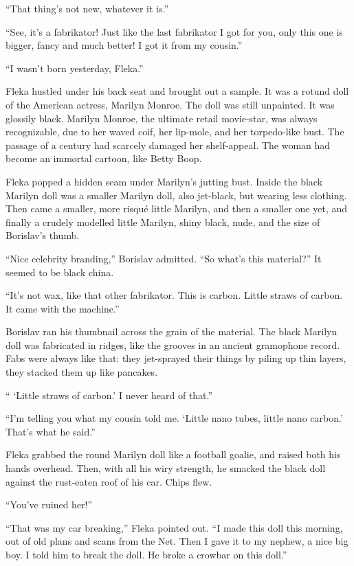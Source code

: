 \documentclass[20 pt,twoside,extrafontsizes,final]{memoir}
\begin{document}
``That thing's not new, whatever it is.''

``See, it's a fabrikator! Just like the last fabrikator I got for you, only this one is bigger, fancy and much better! I got it from my cousin.''

``I wasn't born yesterday, Fleka.''

Fleka hustled under his back seat and brought out a sample. It was a rotund doll of the American actress, Marilyn Monroe. The doll was still unpainted. It was glossily black.
Marilyn Monroe, the ultimate retail movie-star, was always recognizable, due to her waved coif, her lip-mole, and her torpedo-like bust. The passage of a century had scarcely damaged her shelf-appeal. The woman had become an immortal cartoon, like Betty Boop.

Fleka popped a hidden seam under Marilyn's jutting bust. Inside the black Marilyn doll was a smaller Marilyn doll, also jet-black, but wearing less clothing. Then came a smaller, more risqu\'e little Marilyn, and then a smaller one yet, and finally a crudely modelled little Marilyn, shiny black, nude, and the size of Borislav's thumb.

``Nice celebrity branding,'' Borislav admitted. ``So what's this material?'' It seemed to be black china.

``It's not wax, like that other fabrikator. This is carbon. Little straws of carbon. It came with the machine.''

Borislav ran his thumbnail across the grain of the material. The black Marilyn doll was fabricated in ridges, like the grooves in an ancient gramophone record. Fabs were always like that: they jet-sprayed their things by piling up thin layers, they stacked them up like pancakes. 

`` `Little straws of carbon.' I never heard of that.''

``I'm telling you what my cousin told me. `Little nano tubes, little nano carbon.' That's what he said.''

Fleka grabbed the round Marilyn doll like a football goalie, and raised both his hands overhead. Then, with all his wiry strength, he smacked the black doll against the rust-eaten roof of his car. Chips flew.

``You've ruined her!''

``That was my car breaking,'' Fleka pointed out. ``I made this doll this morning, out of old plans and scans from the Net. Then I gave it to my nephew, a nice big boy. I told him to break the doll. He broke a crowbar on this doll.''
\end{document}

